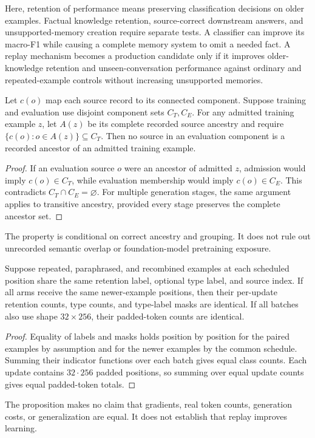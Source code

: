 Here, retention of performance means preserving classification decisions on older examples. Factual knowledge retention, source-correct downstream answers, and unsupported-memory creation require separate tests. A classifier can improve its macro-F1 while causing a complete memory system to omit a needed fact. A replay mechanism becomes a production candidate only if it improves older-knowledge retention and unseen-conversation performance against ordinary and repeated-example controls without increasing unsupported memories.

\begin{proposition}
Let $c(o)$ map each source record to its connected component. Suppose training and evaluation use disjoint component sets $C_T,C_E$. For any admitted training example $z$, let $A(z)$ be its complete recorded source ancestry and require $\{c(o):o\in A(z)\}\subseteq C_T$. Then no source in an evaluation component is a recorded ancestor of an admitted training example.
\end{proposition}
\begin{proof}
If an evaluation source $o$ were an ancestor of admitted $z$, admission would imply $c(o)\in C_T$, while evaluation membership would imply $c(o)\in C_E$. This contradicts $C_T\cap C_E=\varnothing$. For multiple generation stages, the same argument applies to transitive ancestry, provided every stage preserves the complete ancestor set.
\end{proof}
The property is conditional on correct ancestry and grouping. It does not rule out unrecorded semantic overlap or foundation-model pretraining exposure.

\begin{proposition}
Suppose repeated, paraphrased, and recombined examples at each scheduled position share the same retention label, optional type label, and source index. If all arms receive the same newer-example positions, then their per-update retention counts, type counts, and type-label masks are identical. If all batches also use shape $32\times256$, their padded-token counts are identical.
\end{proposition}
\begin{proof}
Equality of labels and masks holds position by position for the paired examples by assumption and for the newer examples by the common schedule. Summing their indicator functions over each batch gives equal class counts. Each update contains $32\cdot256$ padded positions, so summing over equal update counts gives equal padded-token totals.
\end{proof}
The proposition makes no claim that gradients, real token counts, generation costs, or generalization are equal. It does not establish that replay improves learning.
